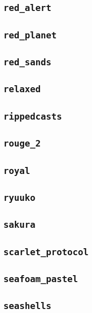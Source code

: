 \subsection{\texttt{red\_alert}}
\newpage
\subsection{\texttt{red\_planet}}
\newpage
\subsection{\texttt{red\_sands}}
\newpage
\subsection{\texttt{relaxed}}
\newpage
\subsection{\texttt{rippedcasts}}
\newpage
\subsection{\texttt{rouge\_2}}
\newpage
\subsection{\texttt{royal}}
\newpage
\subsection{\texttt{ryuuko}}
\newpage
\subsection{\texttt{sakura}}
\newpage
\subsection{\texttt{scarlet\_protocol}}
\newpage
\subsection{\texttt{seafoam\_pastel}}
\newpage
\subsection{\texttt{seashells}}
\newpage
